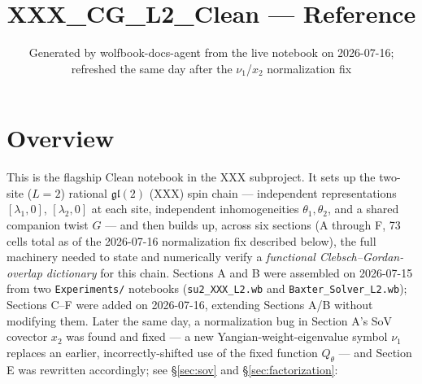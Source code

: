 \documentclass[11pt]{article}
\title{XXX\_CG\_L2\_Clean --- Reference}
\author{}
\date{Generated by wolfbook-docs-agent from the live notebook on 2026-07-16;\\
  refreshed the same day after the $\nu_1$/$x_2$ normalization fix}
\begin{document}
\maketitle

\section*{Overview}

This is the flagship Clean notebook in the XXX subproject. It sets up the two-site ($L=2$) rational
$\mathfrak{gl}(2)$ (XXX) spin chain --- independent representations $[\lambda_1,0]$, $[\lambda_2,0]$
at each site, independent inhomogeneities $\theta_1,\theta_2$, and a shared companion twist $G$ ---
and then builds up, across six sections (A through F, 73 cells total as of the 2026-07-16
normalization fix described below), the full machinery needed to state and numerically verify a
\emph{functional Clebsch--Gordan-overlap dictionary} for this chain. Sections A and B were
assembled on 2026-07-15 from two \texttt{Experiments/} notebooks (\texttt{su2\_XXX\_L2.wb} and
\texttt{Baxter\_Solver\_L2.wb}); Sections C--F were added on 2026-07-16, extending Sections A/B
without modifying them. Later the same day, a normalization bug in Section A's SoV covector $x_2$
was found and fixed --- a new Yangian-weight-eigenvalue symbol $\nu_1$ replaces an earlier,
incorrectly-shifted use of the fixed function $Q_\theta$ --- and Section E was rewritten
accordingly; see \S\ref{sec:sov} and \S\ref{sec:factorization}:
\end{document}
